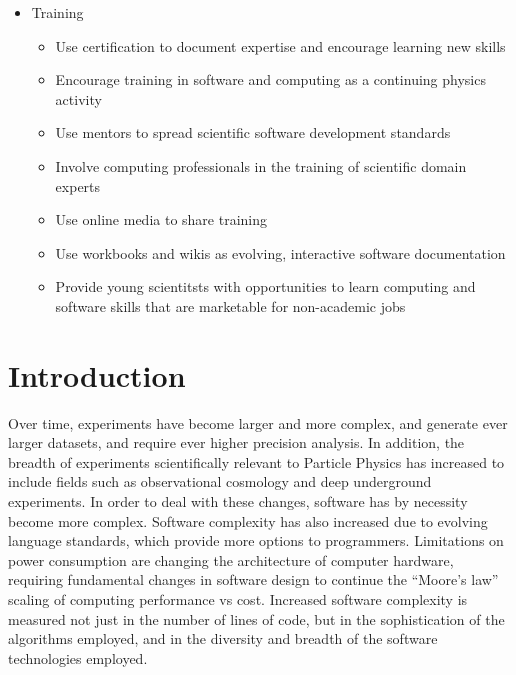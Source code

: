 \begin{itemize}
    \item Training
    \begin{itemize}
        \item Use certification to document expertise and encourage learning new skills
        \item Encourage training in software and computing as a continuing physics activity
        \item Use mentors to spread scientific software development standards
        \item Involve computing professionals in the training of scientific domain experts
        \item Use online media to share training
        \item Use workbooks and wikis as evolving, interactive software documentation
        \item Provide young scientitsts with opportunities to learn computing and software skills that are marketable for non-academic jobs
    \end{itemize}

\end{itemize}


\section{Introduction}
\label{sec:Intro}

Over time, \HEP experiments have become larger and more complex, and generate ever larger datasets, and require ever higher
precision analysis.  In addition, the breadth of experiments scientifically relevant to Particle Physics has increased to
include fields such as observational cosmology and deep underground experiments.
In order to deal with these changes, \HEP software has by necessity become more complex.
Software complexity has also increased due to evolving language standards, which provide more options to programmers.
Limitations on power consumption are changing the architecture of computer hardware,
requiring fundamental changes in software design to continue the ``Moore's law'' scaling of computing performance vs cost.
Increased software complexity is measured not just in
the number of lines of code, but in the sophistication of the algorithms employed, and in the diversity and
breadth of the software technologies employed.

